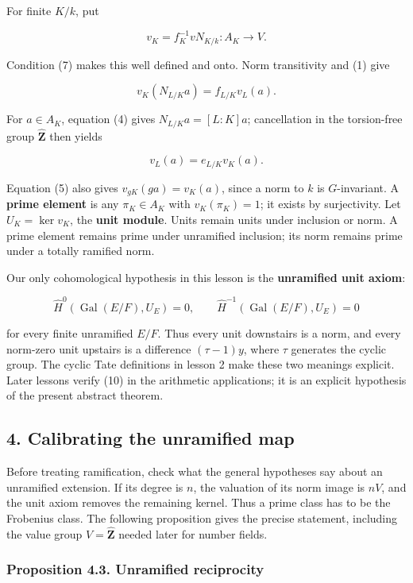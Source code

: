 \documentclass[11pt,a4paper]{article}
\begin{document}
For finite \(K/k\), put

\[
v_K=f_K^{-1}vN_{K/k}:A_K\longrightarrow V.
\]

Condition (7) makes this well defined and onto. Norm transitivity and
(1) give

\[
v_K(N_{L/K}a)=f_{L/K}v_L(a).
\tag{8}
\]

For \(a\in A_K\), equation (4) gives \(N_{L/K}a=[L:K]a\); cancellation
in the torsion-free group \(\widehat{\mathbf Z}\) then yields

\[
v_L(a)=e_{L/K}v_K(a).
\tag{9}
\]

Equation (5) also gives \(v_{gK}(ga)=v_K(a)\), since a norm to \(k\) is
\(G\)-invariant. A \textbf{prime element} is any \(\pi_K\in A_K\) with
\(v_K(\pi_K)=1\); it exists by surjectivity. Let \(U_K=\ker v_K\), the
\textbf{unit module}. Units remain units under inclusion or norm. A
prime element remains prime under unramified inclusion; its norm remains
prime under a totally ramified norm.

Our only cohomological hypothesis in this lesson is the
\textbf{unramified unit axiom}:

\[
\widehat H^0(\operatorname{Gal}(E/F),U_E)=0,
\qquad
\widehat H^{-1}(\operatorname{Gal}(E/F),U_E)=0
\tag{10}
\]

for every finite unramified \(E/F\). Thus every unit downstairs is a
norm, and every norm-zero unit upstairs is a difference \((\tau-1)y\),
where \(\tau\) generates the cyclic group. The cyclic Tate definitions
in lesson 2 make these two meanings explicit. Later lessons verify (10)
in the arithmetic applications; it is an explicit hypothesis of the
present abstract theorem.

\subsection{4. Calibrating the unramified
map}\label{calibrating-the-unramified-map}

Before treating ramification, check what the general hypotheses say
about an unramified extension. If its degree is \(n\), the valuation of
its norm image is \(nV\), and the unit axiom removes the remaining
kernel. Thus a prime class has to be the Frobenius class. The following
proposition gives the precise statement, including the value group
\(V=\widehat{\mathbf Z}\) needed later for number fields.

\subsubsection{Proposition 4.3. Unramified
reciprocity}\label{proposition-4.3.-unramified-reciprocity}
\end{document}
